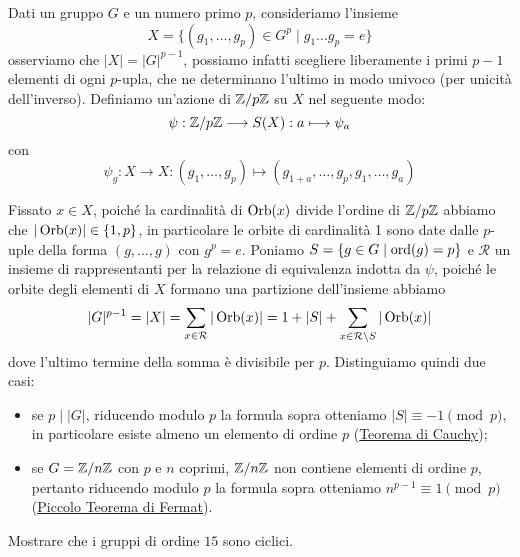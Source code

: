 \documentclass[11pt]{scrartcl}
\begin{document}
Dati un gruppo $G$ e un numero primo $p$, consideriamo l'insieme 
\[
    X = \{(g_1, \ldots, g_p) \in G^p\mid g_1\ldots g_p = e\}
\]osserviamo che $|X| = |G|^{p - 1}$, possiamo infatti scegliere liberamente
i primi $p - 1$ elementi di ogni $p$-upla, che ne determinano l'ultimo in 
modo univoco (per unicità dell'inverso). Definiamo un'azione di ${\mathbb Z}/p{\mathbb Z}$ su $X$
nel seguente modo:
\[
    \psi: {\mathbb Z}/p{\mathbb Z} \longrightarrow S(X) : a \longmapsto \psi_a
\]
con
\[
    \psi_g:X\longrightarrow X : (g_1, \ldots, g_p)\longmapsto (g_{1 + a}, \ldots, g_p, g_1, \ldots, g_a)
\]

Fissato $x \in X$, poiché la cardinalità di $\operatorname{Orb}(x)$ divide l'ordine di ${\mathbb Z}/p{\mathbb Z}$
abbiamo che $|\operatorname{Orb}(x)| \in \{1, p\}$, in particolare le orbite di cardinalità
1 sono date dalle $p$-uple della forma $(g, \ldots, g)$ con $g^p = e$.
Poniamo $S = \{g\in G \mid \operatorname{ord}(g) = p\}$ e $\mathcal{R}$ un insieme di 
rappresentanti per la relazione di equivalenza indotta da $\psi$, poiché 
le orbite degli elementi di $X$ formano una partizione dell'insieme abbiamo
\[
    |G|^{p - 1} = |X| = \sum_{x \in \mathcal{R}} |\operatorname{Orb}(x)| = 1 + |S| + \sum_{x \in \mathcal{R}\setminus S}|\operatorname{Orb}(x)|
\]dove l'ultimo termine della somma è divisibile per $p$. Distinguiamo 
quindi due casi:
\begin{itemize}
    \item se $p\mid |G|$, riducendo modulo $p$ la formula sopra otteniamo
    $|S| \equiv -1 \pmod p$, in particolare esiste almeno un elemento di
    ordine $p$ (\hyperref[teorema1.0]{Teorema di Cauchy});
    \item se $G = {\mathbb Z}/n{\mathbb Z}$ con $p$ e $n$ coprimi, ${\mathbb Z}/n{\mathbb Z}$ non contiene elementi
    di ordine $p$, pertanto riducendo modulo $p$ la formula sopra otteniamo
    $n^{p - 1} \equiv 1 \pmod p$ (\hyperref[teorema2.0]{Piccolo Teorema di Fermat}).
\end{itemize}

\begin{exercise}
    Mostrare che i gruppi di ordine $15$ sono ciclici.
\end{exercise}
\end{document}
